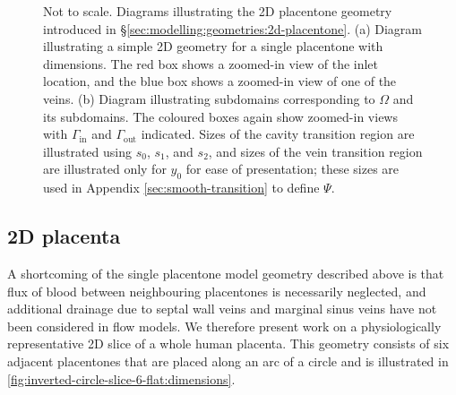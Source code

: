             \begin{figure}
                \begin{subfigure}{\textwidth}
                    \centering
                    
                    \caption{}
                    \label{fig:box-circle:dimensions}
                \end{subfigure}
                \begin{subfigure}{\textwidth}
                    \centering
                    
                    \caption{}
                    \label{fig:box-circle:regions}
                \end{subfigure}
                \caption{Not to scale. Diagrams illustrating the 2D placentone geometry introduced in \S\ref{sec:modelling:geometries:2d-placentone}. (a) Diagram illustrating a simple 2D geometry for a single placentone with dimensions. The red box shows a zoomed-in view of the inlet location, and the blue box shows a zoomed-in view of one of the veins. (b) Diagram illustrating subdomains corresponding to $\Omega$ and its subdomains. The coloured boxes again show zoomed-in views with $\Gamma_\text{in}$ and $\Gamma_\text{out}$ indicated. Sizes of the cavity transition region are illustrated using $s_0$, $s_1$, and $s_2$, and sizes of the vein transition region are illustrated only for $y_0$ for ease of presentation; these sizes are used in Appendix \ref{sec:smooth-transition} to define $\Psi$.}
                \label{fig:box-circle}
            \end{figure}

        \subsection{2D placenta} \label{sec:modelling:geometries:2d-placenta}        
            A shortcoming of the single placentone model geometry described above is that flux of blood between neighbouring placentones is necessarily neglected, and additional drainage due to septal wall veins and marginal sinus veins have not been considered in flow models. We therefore present work on a physiologically representative 2D slice of a whole human placenta. This geometry consists of six adjacent placentones that are placed along an arc of a circle and is illustrated in \ref{fig:inverted-circle-slice-6-flat:dimensions}.

